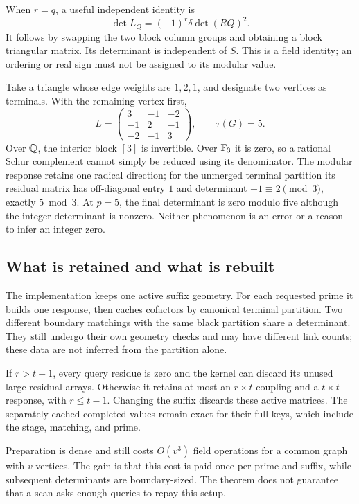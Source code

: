 When $r=q$, a useful independent identity is
\begin{equation}
                       \det L_Q=(-1)^r\delta\det(RQ)^2.
 \label{eq:critical}
\end{equation}
It follows by swapping the two block column groups and obtaining a block
triangular matrix. Its determinant is independent of $S$. This is a field
identity; an ordering or real sign must not be assigned to its modular value.

\begin{example}
Take a triangle whose edge weights are $1,2,1$, and designate two vertices
as terminals. With the remaining vertex first,
\[
 L=\begin{pmatrix}
 3&-1&-2\\-1&2&-1\\-2&-1&3
 \end{pmatrix},\qquad \tau(G)=5.
\]
Over $\mathbb Q$, the interior block $[3]$ is invertible. Over $\mathbb F_3$ it is zero,
so a rational Schur complement cannot simply be reduced using its denominator.
The modular response retains one radical direction; for the unmerged terminal
partition its residual matrix has off-diagonal entry $1$ and determinant
$-1\equiv2\pmod3$, exactly $5\bmod3$.
At $p=5$, the final determinant is zero modulo five although the integer
determinant is nonzero. Neither phenomenon is an error or a reason to infer
an integer zero.
\end{example}

\subsection{What is retained and what is rebuilt}

The implementation keeps one active suffix geometry. For each requested prime
it builds one response, then caches cofactors by canonical terminal partition.
Two different boundary matchings with the same black partition share a
determinant. They still undergo their own geometry checks and may have different
link counts; these data are not inferred from the partition alone.

If $r>t-1$, every query residue is zero and the kernel can discard its unused
large residual arrays. Otherwise it retains at most an $r\times t$ coupling
and a $t\times t$ response, with $r\le t-1$. Changing the suffix discards these
active matrices. The separately cached completed values remain exact for their
full keys, which include the stage, matching, and prime.

Preparation is dense and still costs $O(v^3)$ field operations for a common
graph with $v$ vertices. The gain is that this cost is paid once per prime and
suffix, while subsequent determinants are boundary-sized. The theorem does not
guarantee that a scan asks enough queries to repay this setup.
